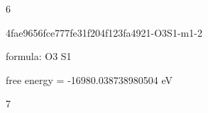 \documentclass{article}
\begin{document}
6

\vspace{1cm}


4fae9656fce777fe31f204f123fa4921-O3S1-m1-2



formula: O3 S1



free energy = -16980.038738980504 eV

7
\end{document}
